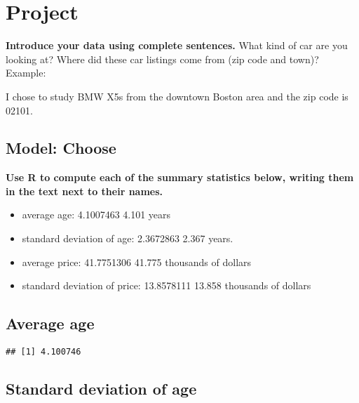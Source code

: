 \documentclass[
]{article}
\newenvironment{Shaded}{\begin{snugshade}}{\end{snugshade}}
\newcommand{\FunctionTok}[1]{\textcolor[rgb]{0.00,0.00,0.00}{#1}}
\newcommand{\NormalTok}[1]{#1}
\newcommand{\SpecialCharTok}[1]{\textcolor[rgb]{0.00,0.00,0.00}{#1}}
\providecommand{\tightlist}{%
  \setlength{\itemsep}{0pt}\setlength{\parskip}{0pt}}
\begin{document}
\hypertarget{project}{%
\section{Project}\label{project}}

\textbf{Introduce your data using complete sentences.} What kind of car
are you looking at? Where did these car listings come from (zip code and
town)? Example:

I chose to study BMW X5s from the downtown Boston area and the zip code
is 02101.

\hypertarget{model-choose}{%
\subsection{Model: Choose}\label{model-choose}}

\textbf{Use R to compute each of the summary statistics below, writing
them in the text next to their names.}

\begin{itemize}
\tightlist
\item
  average age: 4.1007463 4.101 years
\item
  standard deviation of age: 2.3672863 2.367 years.
\item
  average price: 41.7751306 41.775 thousands of dollars
\item
  standard deviation of price: 13.8578111 13.858 thousands of dollars
\end{itemize}

\hypertarget{average-age}{%
\subsection{Average age}\label{average-age}}

\begin{Shaded}
\end{Shaded}

\begin{verbatim}
## [1] 4.100746
\end{verbatim}

\hypertarget{standard-deviation-of-age}{%
\subsection{Standard deviation of age}\label{standard-deviation-of-age}}
\end{document}
